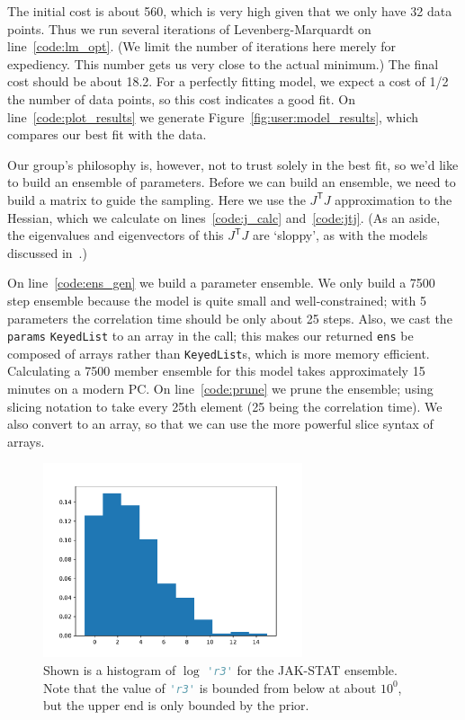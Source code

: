 \documentclass[12pt]{article}
\makeatletter
\newcommand{\transpose}[1]{\ensuremath{{#1}^\mathsf{T}}}
\newcommand{\JtJ}{\ensuremath{\transpose{J}\!J}\xspace}
\newcommand{\py}[1]{\lstinline[language=Python, showstringspaces=False]@#1@}
\makeatother
\begin{document}
The initial cost is about 560, which is very high given that we only have 32 data points.
Thus we run several iterations of Levenberg-Marquardt on line~\ref{code:lm_opt}.
(We limit the number of iterations here merely for expediency. This number gets us very close to the actual minimum.)
The final cost should be about 18.2. For a perfectly fitting model, we expect a cost of 1/2 the number of data points, so this cost indicates a good fit.
On line~\ref{code:plot_results} we generate Figure~\ref{fig:user:model_results}, which compares our best fit with the data.

Our group's philosophy is, however, not to trust solely in the best fit, so we'd like to build an ensemble of parameters.
Before we can build an ensemble, we need to build a matrix to guide the sampling.
Here we use the \JtJ approximation to the Hessian, which we calculate on lines~\ref{code:j_calc} and~\ref{code:jtj}.
(As an aside, the eigenvalues and eigenvectors of this \JtJ are `sloppy', as with the models discussed in~\cite{bib:Brown2003a, bib:Waterfall2006, bib:Gutenkunst2007}.)

On line~\ref{code:ens_gen} we build a parameter ensemble.
We only build a 7500 step ensemble because the model is quite small and well-constrained; with 5 parameters the correlation time should be only about 25 steps.
Also, we cast the \py{params} \py{KeyedList} to an array in the call; this makes our returned \py{ens} be composed of arrays rather than \py{KeyedList}s, which is more memory efficient.
Calculating a 7500 member ensemble for this model takes approximately 15 minutes on a modern PC.
On line~\ref{code:prune} we prune the ensemble; using slicing notation to take every 25th element (25 being the correlation time).
We also convert to an array, so that we can use the more powerful slice syntax of arrays.

\begin{figure}
\begin{center}
\includegraphics[width=3in]{../../Example/JAK-STAT/hist}
\end{center}
\caption[Histogram of $\log$ \py{'r3'} for the JAK-STAT model]{Shown is a histogram of $\log$ \py{'r3'} for the JAK-STAT ensemble. Note that the value of \py{'r3'} is bounded from below at about $10^0$, but the upper end is only bounded by the prior.\label{fig:user:hist}}
\end{figure}
\end{document}
